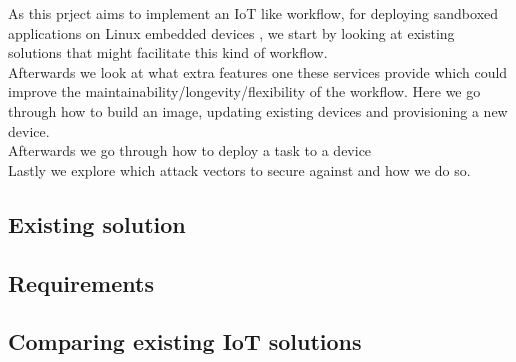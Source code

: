 \documentclass[../../main.tex]{subfiles}
\begin{document}
As this prject aims to implement an IoT like workflow, for deploying sandboxed applications
on Linux embedded devices , we start by looking at existing solutions that might
facilitate this kind of workflow.\\

Afterwards we look at what extra features one these services provide which could improve
the maintainability/longevity/flexibility of the workflow.
Here we go through how to build an image, updating existing devices and provisioning a new
device.\\

Afterwards we go through how to deploy a task to a device\\

Lastly we explore which attack vectors to secure against and how we do so.

\subsection{Existing solution}%
\label{sub:existing_solution}


\subsection{Requirements}%
\label{sub:requirements}


\subsection{Comparing existing IoT solutions}%
\label{sub:comparing_existing_iot_solutions}

	
\end{document}
